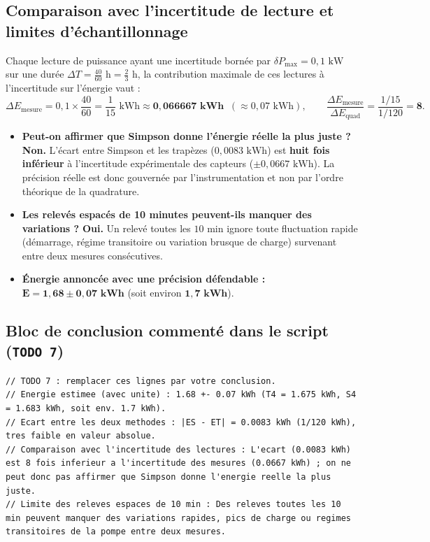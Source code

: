 \documentclass[10pt,a4paper]{article}
\begin{document}
\subsection{Comparaison avec l'incertitude de lecture et limites d'échantillonnage}
Chaque lecture de puissance ayant une incertitude bornée par $\delta P_{\max} = 0,1\text{ kW}$ sur une durée $\Delta T = \frac{40}{60}\text{ h} = \frac{2}{3}\text{ h}$, la contribution maximale de ces lectures à l'incertitude sur l'énergie vaut :
\begin{equation}
    \Delta E_{\text{mesure}} = 0,1 \times \frac{40}{60} = \frac{1}{15}\text{ kWh} \approx \mathbf{0,066667\text{ kWh}} \;\;(\approx 0,07\text{ kWh}), \qquad \frac{\Delta E_{\text{mesure}}}{\Delta E_{\text{quad}}} = \frac{1/15}{1/120} = \mathbf{8}.
\end{equation}

\begin{itemize}
    \item \textbf{Peut-on affirmer que Simpson donne l'énergie réelle la plus juste ?} \textbf{Non.} L'écart entre Simpson et les trapèzes ($0,0083\text{ kWh}$) est \textbf{huit fois inférieur} à l'incertitude expérimentale des capteurs ($\pm 0,0667\text{ kWh}$). La précision réelle est donc gouvernée par l'instrumentation et non par l'ordre théorique de la quadrature.
    \item \textbf{Les relevés espacés de 10 minutes peuvent-ils manquer des variations ?} \textbf{Oui.} Un relevé toutes les $10\text{ min}$ ignore toute fluctuation rapide (démarrage, régime transitoire ou variation brusque de charge) survenant entre deux mesures consécutives.
    \item \textbf{Énergie annoncée avec une précision défendable :} $\mathbf{E = 1,68 \pm 0,07\text{ kWh}}$ (soit environ $\mathbf{1,7\text{ kWh}}$).
\end{itemize}

\subsection{Bloc de conclusion commenté dans le script (\texttt{TODO 7})}
\noindent\begin{minipage}{\textwidth}
\begin{lstlisting}[caption={Conclusion de quatre lignes inscrite dans le fichier \texttt{.sce} (\texttt{TODO 7}).}]
// TODO 7 : remplacer ces lignes par votre conclusion.
// Energie estimee (avec unite) : 1.68 +- 0.07 kWh (T4 = 1.675 kWh, S4 = 1.683 kWh, soit env. 1.7 kWh).
// Ecart entre les deux methodes : |ES - ET| = 0.0083 kWh (1/120 kWh), tres faible en valeur absolue.
// Comparaison avec l'incertitude des lectures : L'ecart (0.0083 kWh) est 8 fois inferieur a l'incertitude des mesures (0.0667 kWh) ; on ne peut donc pas affirmer que Simpson donne l'energie reelle la plus juste.
// Limite des releves espaces de 10 min : Des releves toutes les 10 min peuvent manquer des variations rapides, pics de charge ou regimes transitoires de la pompe entre deux mesures.
\end{lstlisting}
\end{minipage}
\end{document}

